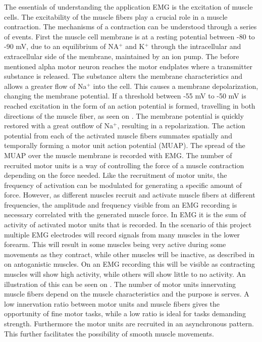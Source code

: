 The essentials of understanding the application EMG is the excitation of muscle cells. The excitability of the muscle fibers play a crucial role in a muscle contraction. The mechanisms of a contraction can be understood through a series of events. First the muscle cell membrane is at a resting potential between -80 to -90 mV, due to an equilibrium of NA$^+$ and K$^+$ through the intracellular and extracellular side of the membrane, maintained by an ion pump. The before mentioned alpha motor neuron reaches the motor endplates where a transmitter substance is released. The substance alters the membrane characteristics and allows a greater flow of Na$^+$ into the cell. This causes a membrane depolarization, changing the membrane potential. If a threshold between -55 mV to -50 mV is reached excitation in the form of an action potential is formed, travelling in both directions of the muscle fiber, as seen on . The membrane potential is quickly restored with a great outflow of Na$^+$, resulting in a repolarization. The action potential from each of the activated muscle fibers summates spatially and temporally forming a motor unit action potential (MUAP). The spread of the MUAP over the muscle membrane is recorded with EMG. The number of recruited motor units is a way of controlling the force of a muscle contraction depending on the force needed. Like the recruitment of motor units, the frequency of activation can be modulated for generating a specific amount of force. However, as different muscles recruit and activate muscle fibers at different frequencies, the amplitude and frequency visible from an EMG recording is necessary correlated with the generated muscle force. In EMG it is the sum of activity of activated motor units that is recorded. \cite{Cram2012} In the scenario of this project multiple EMG electrodes will record signals from many muscles in the lower forearm. This will result in some muscles being very active during some movements as they contract, while other muscles will be inactive, as described in  on antoganistic muscles. On an EMG recording this will be visible as contracting muscles will show high activity, while others will show little to no activity. An illustration of this can be seen on .
The number of motor units innervating muscle fibers depend on the muscle characteristics and the purpose is serves. A low innervation ratio between motor units and muscle fibers gives the opportunity of fine motor tasks, while a low ratio is ideal for tasks demanding strength. Furthermore the motor units are recruited in an asynchronous pattern. This further facilitates the possibility of smooth muscle movements. \cite{Martini2012, Cram2012}

